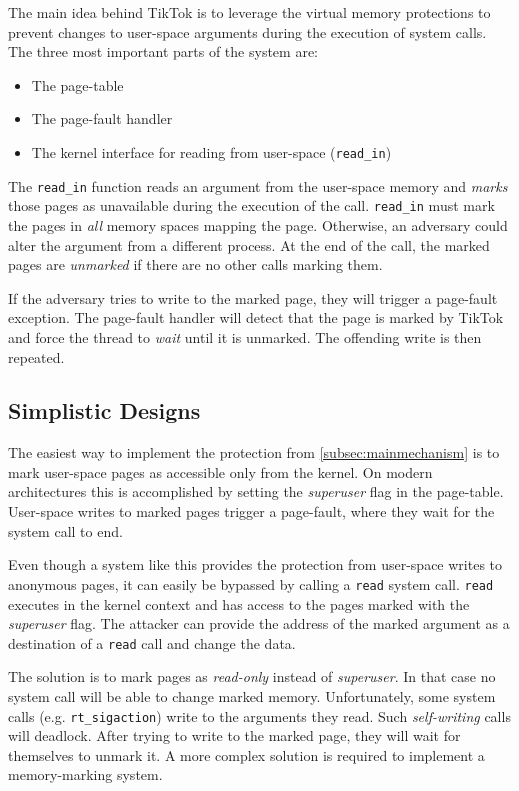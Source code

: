 \documentclass[conference]{IEEEtran}
\newcommand{\sysname}{TikTok}
\begin{document}
The main idea behind \sysname{} is to leverage the virtual memory protections to
prevent changes to user-space arguments during the execution of system calls.
The three most important parts of the system are:

\begin{itemize}
\item The page-table
\item The page-fault handler
\item The kernel interface for reading from user-space (\texttt{read\_in})
\end{itemize}

The \texttt{read\_in} function reads an argument from the user-space memory and
\emph{marks} those pages as unavailable during the execution of the call.
\texttt{read\_in} must mark the pages in \emph{all} memory spaces mapping the
page. Otherwise, an adversary could alter the argument from a different process.
At the end of the call, the marked pages are \emph{unmarked} if there are no
other calls marking them.

If the adversary tries to write to the marked page, they will trigger a
page-fault exception. The page-fault handler will detect that the page is marked
by \sysname{} and force the thread to \emph{wait} until it is unmarked. The
offending write is then repeated. 


\subsection{Simplistic Designs}
\label{subsec:simplistic}
The easiest way to implement the protection from \autoref{subsec:mainmechanism}
is to mark user-space pages as accessible only from the kernel. On modern
architectures this is accomplished by setting the \emph{superuser} flag in the
page-table. User-space writes to marked pages trigger a page-fault, where they
wait for the system call to end.

Even though a system like this provides the protection from user-space
writes to anonymous pages, it can easily be bypassed by calling a \texttt{read}
system call. \texttt{read} executes in the kernel context and has access to 
the pages marked with the \emph{superuser} flag. The attacker can provide the
address of the marked argument as a destination of a \texttt{read} call and 
change the data.

The solution is to mark pages as \emph{read-only} instead of \emph{superuser}.
In that case no system call will be able to change marked memory. Unfortunately,
some system calls (e.g. \texttt{rt\_sigaction}) write to the arguments they
read. Such \emph{self-writing} calls will deadlock. After trying to write to the
marked page, they will wait for themselves to unmark it. A more complex solution
is required to implement a memory-marking system.
\end{document}
